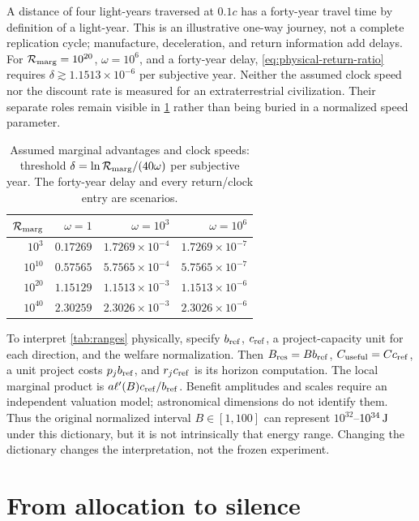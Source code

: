 \documentclass[11pt,a4paper]{article}
\theoremstyle{definition}\newtheorem{definition}{Definition}
\begin{document}
A distance of four light-years traversed at $0.1c$ has a forty-year
travel time by definition of a light-year. This is an illustrative
one-way journey, not a complete replication cycle; manufacture,
deceleration, and return information add delays. For
$\mathcal R_{\rm marg}=10^{20}$, $\omega=10^6$, and a forty-year delay,
\cref{eq:physical-return-ratio} requires
$\delta\gtrsim1.1513\times10^{-6}$ per subjective year.
Neither the assumed clock speed nor the discount rate is measured for
an extraterrestrial civilization. Their separate roles remain visible
in \cref{tab:latency-sensitivity} rather than being buried in a normalized
speed parameter.
\begin{table}[tbp]
\centering
\caption{Assumed marginal advantages and clock speeds: threshold
$\delta=\ln\mathcal R_{\rm marg}/(40\omega)$ per subjective year.
The forty-year delay and every return/clock entry are scenarios.}
\label{tab:latency-sensitivity}
\begin{tabular}{@{}rrrr@{}}\toprule
$\mathcal R_{\rm marg}$ & $\omega=1$ & $\omega=10^3$ & $\omega=10^6$\\\midrule
$10^3$ & $0.17269$ & $1.7269\times10^{-4}$ & $1.7269\times10^{-7}$\\
$10^{10}$ & $0.57565$ & $5.7565\times10^{-4}$ & $5.7565\times10^{-7}$\\
$10^{20}$ & $1.15129$ & $1.1513\times10^{-3}$ & $1.1513\times10^{-6}$\\
$10^{40}$ & $2.30259$ & $2.3026\times10^{-3}$ & $2.3026\times10^{-6}$\\\bottomrule
\end{tabular}
\end{table}

To interpret \cref{tab:ranges} physically, specify $b_{\rm ref}$,
$c_{\rm ref}$, a project-capacity unit for each direction, and the welfare
normalization. Then $B_{\rm res}=Bb_{\rm ref}$,
$C_{\rm useful}=Cc_{\rm ref}$, a unit project costs $p_jb_{\rm ref}$,
and $r_jc_{\rm ref}$ is its horizon computation. The local marginal
product is $a\ell'(B)c_{\rm ref}/b_{\rm ref}$. Benefit amplitudes and
scales require an independent valuation model; astronomical dimensions
do not identify them. Thus the original normalized interval $B\in[1,100]$
can represent $10^{32}$--$10^{34}\,{\rm J}$ under this dictionary, but
it is not intrinsically that energy range. Changing the dictionary
changes the interpretation, not the frozen experiment.

\section{From allocation to silence}
\label{sec:population}
\end{document}
